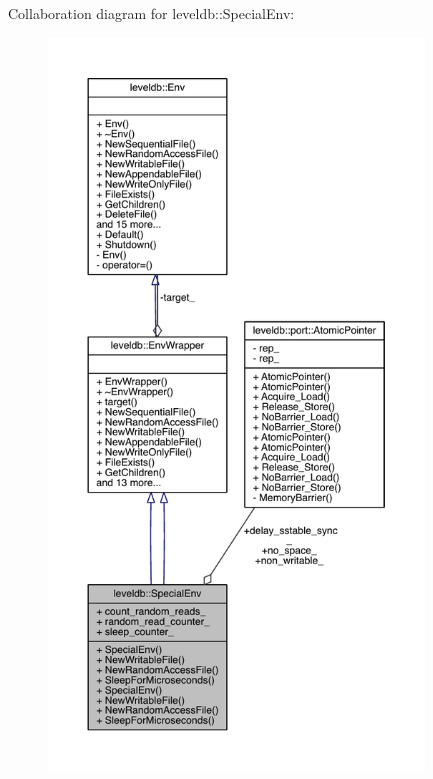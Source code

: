 Collaboration diagram for leveldb\+:\+:Special\+Env\+:
\nopagebreak
\begin{figure}[H]
\begin{center}
\leavevmode
\includegraphics[height=550pt]{classleveldb_1_1_special_env__coll__graph}
\end{center}
\end{figure}
